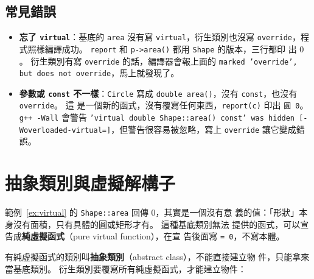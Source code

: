 \subsection{常見錯誤}

\begin{itemize}
\item \textbf{忘了 \texttt{virtual}}：基底的 \texttt{area} 沒有寫
\texttt{virtual}，衍生類別也沒寫 \texttt{override}，程式照樣編譯成功。
\texttt{report} 和 \texttt{p->area()} 都用 \texttt{Shape} 的版本，三行都印
出 $0$。 衍生類別有寫 \texttt{override} 的話，編譯器會報上面的
\texttt{marked 'override', but does not override}，馬上就發現了。
\item \textbf{參數或 \texttt{const} 不一樣}：\texttt{Circle} 寫成
\texttt{double area()}，沒有 \texttt{const}，也沒有 \texttt{override}。 這
是一個新的函式，沒有覆寫任何東西，\texttt{report(c)} 印出 \texttt{圓 0}。
\texttt{g++ -Wall} 會警告 \texttt{'virtual double Shape::area() const' was
hidden [-Woverloaded-virtual=]}，但警告很容易被忽略，寫上
\texttt{override} 讓它變成錯誤。
\end{itemize}

\section{抽象類別與虛擬解構子}
\label{sec:abstract}

範例~\ref{ex:virtual} 的 \texttt{Shape::area} 回傳 $0$，其實是一個沒有意
義的值：「形狀」本身沒有面積，只有具體的圓或矩形才有。 這種基底類別無法
提供的函式，可以宣告成\textbf{純虛擬函式}（pure virtual function），在宣
告後面寫 \texttt{= 0}，不寫本體。

有純虛擬函式的類別叫\textbf{抽象類別}（abstract class），不能直接建立物
件，只能拿來當基底類別。 衍生類別要覆寫所有純虛擬函式，才能建立物件：

